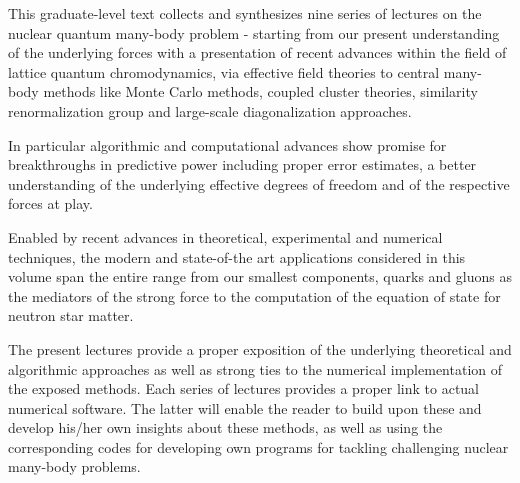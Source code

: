 \preface
This graduate-level text collects and synthesizes nine series of
lectures on the nuclear quantum many-body problem - starting from our
present understanding of the underlying forces with a presentation of
recent advances within the field of lattice quantum chromodynamics,
via effective field theories to central many-body methods like Monte
Carlo methods, coupled cluster theories, similarity renormalization group 
and large-scale
diagonalization approaches.

In particular algorithmic and computational advances show promise for
breakthroughs in predictive power including proper error estimates, a
better understanding of the underlying effective degrees of freedom
and of the respective forces at play.

Enabled by recent advances in theoretical, experimental and numerical
techniques, the modern and state-of-the art applications considered in
this volume span the entire range from our smallest components, quarks
and gluons as the mediators of the strong force to the computation of
the equation of state for neutron star matter.

 

The present lectures provide a proper exposition of the underlying
theoretical and algorithmic approaches as well as strong ties to the
numerical implementation of the exposed methods. Each series of
lectures provides a proper link to actual numerical software. The
latter will enable the reader to build upon these and develop his/her
own insights about these methods, as well as using the corresponding
codes for developing own programs for tackling challenging nuclear
many-body problems.

